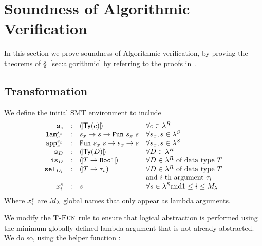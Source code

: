 \section{Soundness of Algorithmic Verification}
%
In this section we prove soundness of Algorithmic verification, 
by proving the theorems of \S~\ref{sec:algorithmic}
by referring to the proofs in~\citep{Vazou14-tech}. 

\subsection{Transformation}

\begin{definition}\label{def:initialsmt}
 We define the initial SMT environment \smtenvinit to include
 $$
 \begin{array}{rcll}
 \smtvar{c}  &\colon &\embed{\constty{c}}
   &\forall c\in \corelan\\
 \smtlamname{\sort_x}{\sort}&\colon&\sort_x \rightarrow \sort\rightarrow\tsmtfun{\sort_x}{\sort}
   &\forall \sort_x, \sort\in \smtlan\\
 \smtappname{\sort_x}{\sort}&\colon&\tsmtfun{\sort_x}{\sort} \rightarrow \sort_x \rightarrow \sort
   &\forall \sort_x, \sort\in \smtlan\\
 \smtvar{\dc}&\colon&\embed{\constty{\dc}}
   &\forall\dc\in\corelan\\
 \checkdc{\dc}&\colon&\embed{T \rightarrow \tbool}
   &\forall \dc\in \corelan\ \text{of data type}\ T \\
 \selector{\dc}{i}&\colon&\embed{T \rightarrow \typ_i}
   &\forall \dc\in \corelan\ \text{of data type}\ T \\
   &&&\text{and}\ i\text{-th argument}\ \typ_i \\
 {x^{\sort}_i} & \colon&{\sort}& \forall \sort \in \smtlan \text{and} 1\leq i\leq \maxlamarg\\
 \end{array}
 $$
Where $x^{s}_i$ are $ {M_\lambda} $ global names that only appear as lambda arguments.
\end{definition}


We modify the $\textsc{T-Fun}$ rule to ensure that 
logical abstraction is performed 
using the minimum globally defined lambda argument that is not already abstracted. 
We do so, using the helper function \maxlam{\sort}{\pred}:

